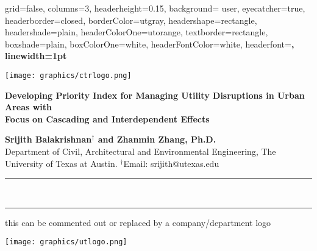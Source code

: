 \documentclass[ctrsize,landscape]{baposter}
\begin{document}
\begin{poster}{
  grid=false,
  columns=3,
  headerheight=0.15\textheight,
  background= user,
  eyecatcher=true,
  headerborder=closed,
  borderColor=utgray,
  headershape=rectangle,
  headershade=plain,
  headerColorOne=utorange,
  textborder=rectangle,
  boxshade=plain,
  boxColorOne=white,
  headerFontColor=white,
  headerfont=\Large\sf\bf,
  linewidth=1pt
}
{
  \begin{minipage}[t][0.9\headerheight][t]{0.15\textwidth}
  \texttt{[image: graphics/ctrlogo.png]}
  \end{minipage}
}
{
\color{white}\bf
  \huge {Developing Priority Index for Managing Utility Disruptions in Urban Areas with\\ Focus on Cascading and Interdependent Effects}
}
{\color{white}
  \vspace{0.5em} \Large {\textbf{Srijith Balakrishnan$^{\dagger}$ and Zhanmin Zhang, Ph.D.}} \\[0.45em]
  \normalsize {\normalfont Department of Civil, Architectural and Environmental Engineering, The University of Texas at Austin. $^{\dagger}$Email: srijith@utexas.edu}\\[0.85em]
  
  \hspace*{-8.4cm}\noindent\textcolor{ctrblue}{\rule{1.46\textwidth}{4pt}}\\[-0.7em]
  \hspace*{-8.4cm}\noindent\textcolor{utorange}{\rule{1.46\textwidth}{4pt}}
  
}
{
  this can be commented out or replaced by a company/department logo
  \begin{minipage}[t][0.9\headerheight][t]{0.15\textwidth}
  \texttt{[image: graphics/utlogo.png]}
  \end{minipage}
}


\end{poster}
\end{document}
